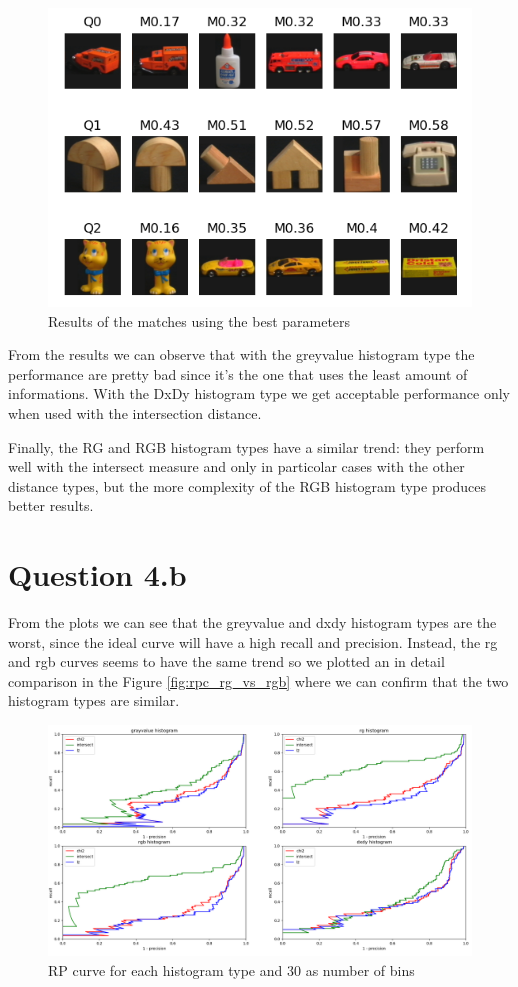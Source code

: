 \documentclass{article}
\begin{document}
\begin{figure}[h!]
\centering
\includegraphics[width=.7\textwidth]{best_match}
\caption{Results of the matches using the best parameters}
\label{fig:best-match}
\end{figure}

From the results we can observe that with the greyvalue histogram type the performance are pretty bad since it's the one that uses the least amount of informations.
With the DxDy histogram type we get acceptable performance only when used with the intersection distance.

Finally, the RG and RGB histogram types have a similar trend: they perform well with the  intersect measure and only in particolar cases with the other distance types, but the more complexity of the RGB histogram type produces better results.

\section*{Question 4.b}

From the plots we can see that the greyvalue and dxdy histogram types are the worst, since the ideal curve will have a high recall and precision.
Instead, the rg and rgb curves seems to have the same trend so we plotted an in detail comparison in the Figure \ref{fig:rpc_rg_vs_rgb} where we can confirm that the two histogram types are similar.

\begin{figure}[ht]
\centering
\includegraphics[width=\textwidth]{rpc_all}
\caption{RP curve for each histogram type and 30 as number of bins}
\label{fig:rpc_all}
\end{figure}
\end{document}
